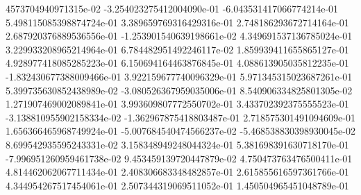 4573704940971315e-02	-3.254023275412004090e-01	-6.043531417066774214e-01	5.498115085398874724e-01	3.389659769316429316e-01	2.748186293672714164e-01	2.687920376889536556e-01	-1.253901540639198661e-02	4.349691537136785024e-01	3.229933208965214964e-01	6.784482951492246117e-02	1.859939411655865127e-01	4.928977418085285223e-01	6.150694164463876845e-01	4.088613905035812235e-01	-1.832430677388009466e-01	3.922159677740096329e-01	5.971345315023687261e-01	5.399735630852438989e-02	-3.080526367959035006e-01	8.540906334825801305e-02	1.271907469002089841e-01	3.993609807772550702e-01	3.433702392375555523e-01	-3.138810955902158334e-02	-1.362967875418803487e-01	2.718575301491094609e-01	1.656366465968749924e-01	-5.007684540474566237e-02	-5.468538830398930045e-02	8.699542935595243331e-02	3.158348949248044324e-01	5.381698391630718170e-01	-7.996951260959461738e-02	9.453459139720447879e-02	4.750473763476500411e-01	4.814462062067711434e-01	2.408306683348482857e-01	2.615855616597361766e-01	4.344954267517454061e-01	2.507344319069511052e-01	1.450504965451048789e-01
